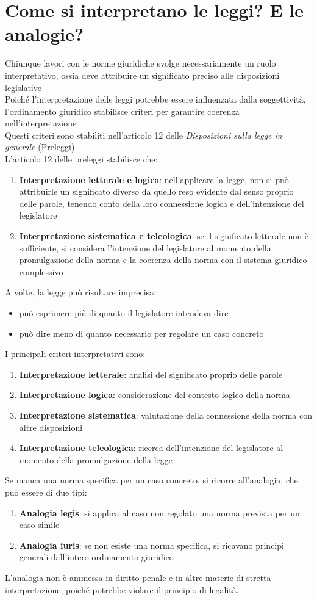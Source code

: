 \documentclass[8pt,oneside,a4paper]{article}
\begin{document}
	\section{Come si interpretano le leggi? E le analogie?}
	Chiunque lavori con le norme giuridiche svolge necessariamente un ruolo interpretativo, ossia deve attribuire un significato preciso alle disposizioni legislative\\
	Poiché l'interpretazione delle leggi potrebbe essere influenzata dalla soggettività, l'ordinamento giuridico stabilisce criteri per garantire coerenza nell'interpretazione\\
	Questi criteri sono stabiliti nell'articolo 12 delle \textit{Disposizioni sulla legge in generale} (Preleggi)\\
	L'articolo 12 delle preleggi stabilisce che:  
	\begin{enumerate}
		\item \textbf{Interpretazione letterale e logica}: nell'applicare la legge, non si può attribuirle un significato diverso da quello reso evidente dal senso proprio delle parole, tenendo conto della loro connessione logica e dell'intenzione del legislatore
		\item \textbf{Interpretazione sistematica e teleologica}: se il significato letterale non è sufficiente, si considera l'intenzione del legislatore al momento della promulgazione della norma e la coerenza della norma con il sistema giuridico complessivo
	\end{enumerate}
	A volte, la legge può risultare imprecisa:  
	\begin{itemize}
		\item può esprimere più di quanto il legislatore intendeva dire
		\item può dire meno di quanto necessario per regolare un caso concreto  
	\end{itemize}
	I principali criteri interpretativi sono:  
	\begin{enumerate}
		\item \textbf{Interpretazione letterale}: analisi del significato proprio delle parole
		\item \textbf{Interpretazione logica}: considerazione del contesto logico della norma
		\item \textbf{Interpretazione sistematica}: valutazione della connessione della norma con altre disposizioni
		\item \textbf{Interpretazione teleologica}: ricerca dell'intenzione del legislatore al momento della promulgazione della legge
	\end{enumerate}Se manca una norma specifica per un caso concreto, si ricorre all'analogia, che può essere di due tipi:  
	\begin{enumerate}
		\item \textbf{Analogia legis}: si applica al caso non regolato una norma prevista per un caso simile
		\item \textbf{Analogia iuris}: se non esiste una norma specifica, si ricavano principi generali dall'intero ordinamento giuridico
	\end{enumerate}
	L'analogia non è ammessa in diritto penale e in altre materie di stretta interpretazione, poiché potrebbe violare il principio di legalità. 
\end{document}
